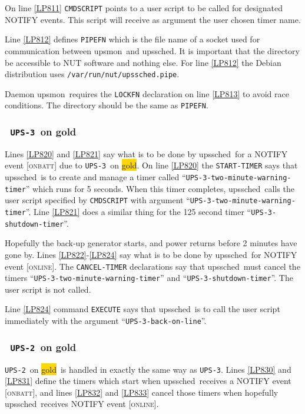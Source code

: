 \documentclass[12pt]{article}
\newlength{\headersep}\setlength{\headersep}{3mm}
\newcommand{\Hsep}{\hspace{\headersep}}
\newcommand{\upsmon}{\mbox{\textcolor{MONCOLOUR}{upsmon}}}
\newcommand{\upssched}{\mbox{\textcolor{SCHEDCOLOUR}{upssched}}}
\newcommand{\gold}[1][gold]{\colorbox{GOLD}{#1}}
\newcommand{\ONLINE}{\textcolor{MONCOLOUR}{\textsc{online}}}
\newcommand{\ONBATT}{\textcolor{MONCOLOUR}{\textsc{onbatt}}}
\newcommand{\NOTev}[1]{\textcolor{MONCOLOUR}{[{#1}]}}
\newcommand{\UPSii}{\texttt{UPS-2}}
\newcommand{\UPSiii}{\texttt{UPS-3}}
\newcommand{\UPSiiiwarntime}{\texttt{\UPSiii{\allowbreak}-two{\allowbreak}-minute{\allowbreak}-warning{\allowbreak}-timer}}
\newcommand{\UPSiiishutdown}{\texttt{\UPSiii{\allowbreak}-shutdown{\allowbreak}-timer}}
\newcommand{\UPSiiionline}{\texttt{\UPSiii{\allowbreak}-back{\allowbreak}-on{\allowbreak}-line}}
\begin{document}
On line \ref{LP811} \texttt{CMDSCRIPT} points to a user script to be called
for designated NOTIFY events.  This script will receive as argument the user
chosen timer name.

Line \ref{LP812} defines \texttt{PIPEFN} which is the file name of a socket
used for communication between \upsmon\ and \upssched.  It is important that
the directory be accessible to NUT software and nothing else.  For line
\ref{LP812} the Debian distribution uses
\texttt{/var/{\allowbreak}run/nut/{\allowbreak}upssched.pipe}.

Daemon \upsmon\ requires the \texttt{LOCKFN} declaration on line \ref{LP813}
to avoid race conditions.  The directory should be the same as
\texttt{PIPEFN}.

\subsubsection{\Hsep\ \UPSiii\ on gold}\label{UPSiiigold}

Lines \ref{LP820} and \ref{LP821} say what is to be done by \upssched\ for a
NOTIFY event \NOTev{\ONBATT} due to \UPSiii\ on \gold.  On line \ref{LP820}
the \texttt{START-TIMER} says that \upssched\ is to create and manage a timer
called ``\UPSiiiwarntime'' which runs for 5 seconds.  When this timer
completes, \upssched\ calls the user script specified by \texttt{CMDSCRIPT}
with argument ``\UPSiiiwarntime''.  Line \ref{LP821} does a similar thing for
the 125 second timer ``\UPSiiishutdown''.

Hopefully the back-up generator starts, and power returns before 2 minutes
have gone by.  Lines \ref{LP822}-\ref{LP824} say what is to be done by
\upssched\ for NOTIFY event \NOTev{\ONLINE}.  The \texttt{CANCEL-TIMER}
declarations say that \upssched\ must cancel the timers ``\UPSiiiwarntime''
and ``\UPSiiishutdown''.  The user script is not called.

Line \ref{LP824} command \texttt{EXECUTE} says that \upssched\ is to call the
user script immediately with the argument ``\UPSiiionline''.


\subsubsection{\Hsep\ \UPSii\ on gold}\label{UPSiigold}

\UPSii\ on \gold\ is handled in exactly the same way as \UPSiii.  Lines
  \ref{LP830} and \ref{LP831} define the timers which start when
  \upssched\ receives a NOTIFY event \NOTev{\ONBATT}, and lines \ref{LP832}
  and \ref{LP833} cancel those timers when hopefully \upssched\ receives
  NOTIFY event \NOTev{\ONLINE}.
\end{document}
